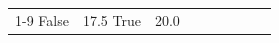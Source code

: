 \begin{table}[H]
\begin{tabular}{lllrlllll}
\cline{1-9}
False & 17.5%
\cline{1-9}
True & 20.0%

\end{tabular}
\end{table}
